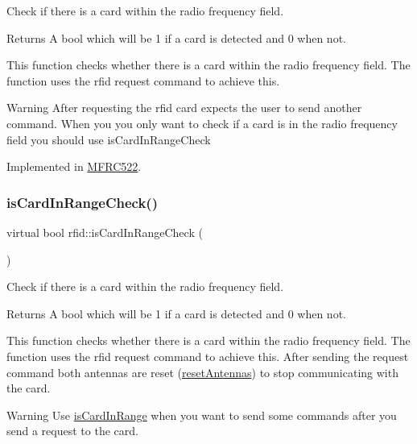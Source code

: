 Check if there is a card within the radio frequency field. 

\begin{DoxyReturn}{Returns}
A bool which will be 1 if a card is detected and 0 when not.
\end{DoxyReturn}
This function checks whether there is a card within the radio frequency field. The function uses the rfid request command to achieve this. \begin{DoxyWarning}{Warning}
After requesting the rfid card expects the user to send another command. When you you only want to check if a card is in the radio frequency field you should use is\+Card\+In\+Range\+Check 
\end{DoxyWarning}


Implemented in \mbox{\hyperlink{class_m_f_r_c522_a019f76569bddf9c2f9f94eca13a618d7}{M\+F\+R\+C522}}.

\mbox{\label{classrfid_a9790d273f2385c8fb48bb85ca2aa0d10}} 
\subsubsection{\texorpdfstring{is\+Card\+In\+Range\+Check()}{isCardInRangeCheck()}}
{\footnotesize\ttfamily virtual bool rfid\+::is\+Card\+In\+Range\+Check (\begin{DoxyParamCaption}{ }\end{DoxyParamCaption})\hspace{0.3cm}{\ttfamily [pure virtual]}}



Check if there is a card within the radio frequency field. 

\begin{DoxyReturn}{Returns}
A bool which will be 1 if a card is detected and 0 when not.
\end{DoxyReturn}
This function checks whether there is a card within the radio frequency field. The function uses the rfid request command to achieve this. After sending the request command both antennas are reset (\mbox{\hyperlink{classrfid_abf4826e77ab7b02f04c8f01d969149c1}{reset\+Antennas}}) to stop communicating with the card. \begin{DoxyWarning}{Warning}
Use \mbox{\hyperlink{classrfid_a23fc4ec0bc3790c5e68269d4f32771b9}{is\+Card\+In\+Range}} when you want to send some commands after you send a request to the card. 
\end{DoxyWarning}


